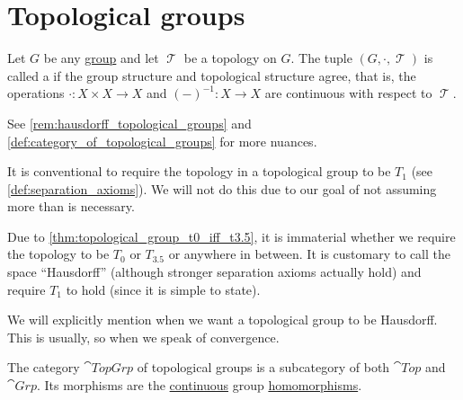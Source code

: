 \section{Topological groups}\label{sec:topological_groups}

\begin{definition}\label{def:topological_semigroup}
\end{definition}

\begin{definition}\label{def:topological_group}
  Let \( G \) be any \hyperref[def:group]{group} and let \( \mscrT \) be a topology on \( G \). The tuple \( (G, \cdot, \mscrT) \) is called a  if the group structure and topological structure agree, that is, the operations \( \cdot: X \times X \to X \) and \( (-)^{-1}: X \to X \) are continuous with respect to \( \mscrT \).

  See \cref{rem:hausdorff_topological_groups} and \cref{def:category_of_topological_groups} for more nuances.
\end{definition}

\begin{remark}\label{rem:hausdorff_topological_groups}
  It is conventional to require the topology in a topological group to be \( T_1 \) (see \cref{def:separation_axioms}). We will not do this due to our goal of not assuming more than is necessary.

  Due to \cref{thm:topological_group_t0_iff_t3.5}, it is immaterial whether we require the topology to be \( T_0 \) or \( T_{3.5} \) or anywhere in between. It is customary to call the space \enquote{Hausdorff} (although stronger separation axioms actually hold) and require \( T_1 \) to hold (since it is simple to state).

  We will explicitly mention when we want a topological group to be Hausdorff. This is usually, so when we speak of convergence.
\end{remark}

\begin{definition}\label{def:category_of_topological_groups}
  The category \( \cat{TopGrp} \) of topological groups is a subcategory of both \( \cat{Top} \) and \( \cat{Grp} \). Its morphisms are the \hyperref[def:global_continuity]{continuous} group \hyperref[thm:group_homomorphism_single_condition]{homomorphisms}.
\end{definition}

